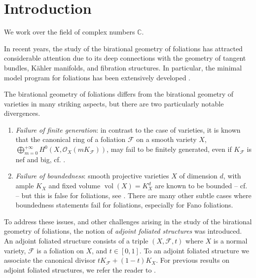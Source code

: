 \documentclass[12pt]{amsart}
\numberwithin{equation}{section}
\newcommand{\vol}{\operatorname{vol}}
\newcommand{\Ff}{\mathcal{F}}
\theoremstyle{definition}
\theoremstyle{definition}
\theoremstyle{definition}
\begin{document}
\maketitle

\pagestyle{myheadings}

\tableofcontents


\section{Introduction}\label{sec:Introduction}
We work over the field of complex numbers $\mathbb{C}$.

In recent years, the study of the birational geometry of foliations has attracted considerable attention due to its deep connections with the geometry of tangent bundles, K\"ahler manifolds, and fibration structures. In particular, the minimal model program for foliations has been extensively developed \cite{McQ08,Bru15,CS20,Spi20,ACSS21,CS21,SS22,CHLX23,CS24,SS23,CHLMSSX24,LMX24,McQ24}.

The birational geometry of foliations differs from the birational geometry of varieties in many striking aspects, but there are two particularly notable divergences.
\begin{enumerate}
    \item {\it Failure of finite generation}: in contrast to the case of varieties, it is known that the canonical ring of a foliation $\mathcal F$ on a smooth variety $X$, $\bigoplus_{m = 0}^{+\infty} H^0(X, \mathcal O_X(mK_{\mathcal F}))$, may fail to be finitely generated, even if $K_{\mathcal F}$ is nef and big, cf. \cite[Theorem IV.2.2]{McQ08}.

    \item {\it Failure of boundedness}: smooth projective varieties $X$ of dimension $d$, with ample $K_X$ and fixed volume $\vol(X) = K_X^d$ are known to be bounded --
    cf. \cite[Theorem 1.1]{HMX18} -- 
    but this is false for foliations, see \cite[Example 4.1]{Pas24}.
    There are many other subtle cases where boundedness statements fail for foliations, especially for Fano foliations.
\end{enumerate}


To address these issues, and other challenges arising in the study of the birational geometry of foliations,  the notion of \emph{adjoint foliated structures} was introduced. An adjoint foliated structure consists of a triple $(X,\Ff,t)$ where $X$ is a normal variety, $\mathcal F$ is a foliation on $X$, and $t \in [0, 1]$. To an adjoint foliated structure we associate the canonical divisor $tK_{\Ff}+(1-t)K_X$. For previous results on adjoint foliated structures, we refer the reader to \cite{PS19,SS23,CHLMSSX24,LW24,CC25,LWX25}. 
\end{document}
